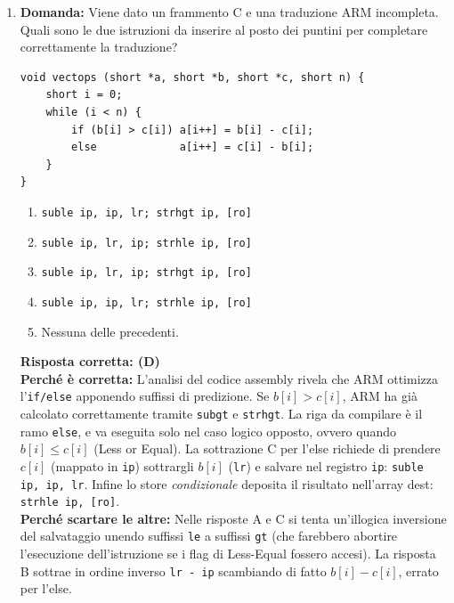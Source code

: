 \documentclass[12pt, a4paper]{article}
\begin{document}
\begin{enumerate}
\newpage
    
    \textbf{Risposta corretta: (B)} \\
    \textbf{Perché è corretta:} Il tempo totale senza pipeline è dato dalla somma dei ritardi di ciascuno stadio: $300 + 200 + 400 + 500 + 100 = 1500$ ps. Quando si implementa la pipeline, la durata del singolo ciclo di clock è determinata unicamente dal collo di bottiglia, ovvero lo stadio più lento, che in questo caso impiega $500$ ps. Il potenziale fattore di miglioramento (Speedup) teorico è pari al tempo sequenziale diviso il nuovo tempo di ciclo: $1500 / 500 = 3.0$. \\
    \textbf{Perché scartare le altre:} (D) varrebbe 5.0 unicamente se la pipeline fosse perfetta e idealmente bilanciata in stadi tutti della medesima durata (cosa falsa qui). Le altre opzioni derivano da somme errate o rapporti inversi.

    \item \textbf{Domanda:} Viene dato un frammento C e una traduzione ARM incompleta. Quali sono le due istruzioni da inserire al posto dei puntini per completare correttamente la traduzione?
\begin{verbatim}
void vectops (short *a, short *b, short *c, short n) {
    short i = 0;
    while (i < n) {
        if (b[i] > c[i]) a[i++] = b[i] - c[i];
        else             a[i++] = c[i] - b[i];
    }
}
\end{verbatim}
    \begin{enumerate}[label=(\Alph*)]
        \item \texttt{suble ip, ip, lr; strhgt ip, [ro]}
        \item \texttt{suble ip, lr, ip; strhle ip, [ro]}
        \item \texttt{suble ip, lr, ip; strhgt ip, [ro]}
        \item \texttt{suble ip, ip, lr; strhle ip, [ro]}
        \item Nessuna delle precedenti.
    \end{enumerate}
    \textbf{Risposta corretta: (D)} \\
    \textbf{Perché è corretta:} L'analisi del codice assembly rivela che ARM ottimizza l'\texttt{if/else} apponendo suffissi di predizione. Se $b[i] > c[i]$, ARM ha già calcolato correttamente tramite \texttt{subgt} e \texttt{strhgt}. La riga da compilare è il ramo \texttt{else}, e va eseguita solo nel caso logico opposto, ovvero quando $b[i] \leq c[i]$ (Less or Equal). La sottrazione C per l'else richiede di prendere $c[i]$ (mappato in \texttt{ip}) sottrargli $b[i]$ (\texttt{lr}) e salvare nel registro \texttt{ip}: \texttt{suble ip, ip, lr}. Infine lo store \textit{condizionale} deposita il risultato nell'array dest: \texttt{strhle ip, [ro]}. \\
    \textbf{Perché scartare le altre:} Nelle risposte A e C si tenta un'illogica inversione del salvataggio unendo suffissi \texttt{le} a suffissi \texttt{gt} (che farebbero abortire l'esecuzione dell'istruzione se i flag di Less-Equal fossero accesi). La risposta B sottrae in ordine inverso \texttt{lr - ip} scambiando di fatto $b[i] - c[i]$, errato per l'else.


\end{enumerate}
\end{document}
